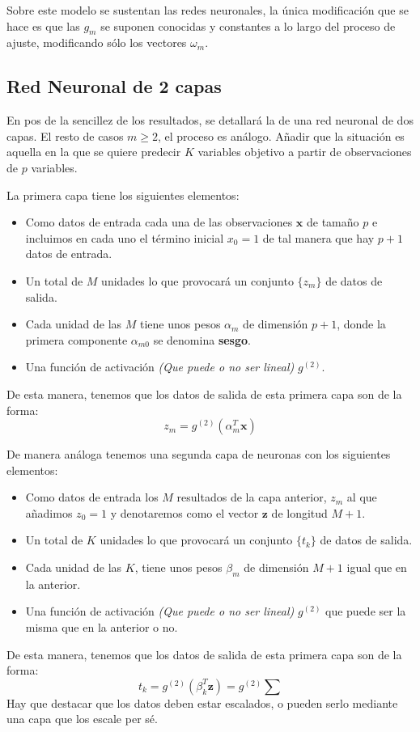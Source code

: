 \noindent Sobre este modelo se sustentan las redes neuronales, la única modificación que se hace es que las $g_m$ se suponen conocidas y constantes a lo largo del proceso de ajuste, modificando sólo los vectores $\omega_m$. 

\newpage
\subsection{Red Neuronal de 2 capas }

\noindent En pos de la sencillez de los resultados, se detallará la  de una red neuronal de dos capas. El resto de casos $m\geq 2$, el proceso es análogo. Añadir que la situación es aquella en la que se quiere predecir $K$ variables objetivo a partir de observaciones de $p$ variables. 

\noindent La primera capa tiene los siguientes elementos:
\begin{itemize}
\item Como datos de entrada cada una de las observaciones $\textbf{x}$ de tamaño $p$ e incluimos en cada uno el término inicial $x_{0}=1$ de tal manera que hay $p+1$ datos de entrada.
\item Un total de $M$ unidades lo que provocará un conjunto $\lbrace z_m \rbrace$ de datos de salida.
\item Cada unidad de las $M$ tiene unos pesos $\alpha_m$ de dimensión $p+1$, donde la primera componente $\alpha_{m0}$ se denomina \textbf{sesgo}.
\item Una función de activación \textit{(Que puede o no ser lineal)} $g^(2)$.
\end{itemize}
\noindent De esta manera, tenemos que los datos de salida de esta primera capa son de la forma:
\begin{equation}
z_m=g^(2)(\alpha_m^T\textbf{x})
\end{equation}

\noindent De manera análoga tenemos una segunda capa de neuronas con los siguientes elementos:
\begin{itemize}
\item Como datos de entrada los $M$ resultados de la capa anterior, $z_m$ al que añadimos $z_0=1$ y denotaremos como el vector $\textbf{z}$ de longitud $M+1$.
\item Un total de $K$ unidades lo que provocará un conjunto $\lbrace t_k \rbrace$ de datos de salida.
\item Cada unidad de las $K$, tiene unos pesos $\beta_m$ de dimensión $M+1$ igual que en la anterior. 
\item Una función de activación \textit{(Que puede o no ser lineal)} $g^{(2)}$ que puede ser la misma que en la anterior o no.
\end{itemize}
\noindent De esta manera, tenemos que los datos de salida de esta primera capa son de la forma:
\begin{equation}
t_k=g^{(2)}(\beta_k^T\textbf{z})=g^{(2)}\sum
\end{equation}
\noindent Hay que destacar que los datos deben estar escalados, o pueden serlo mediante una capa que los escale per sé.
